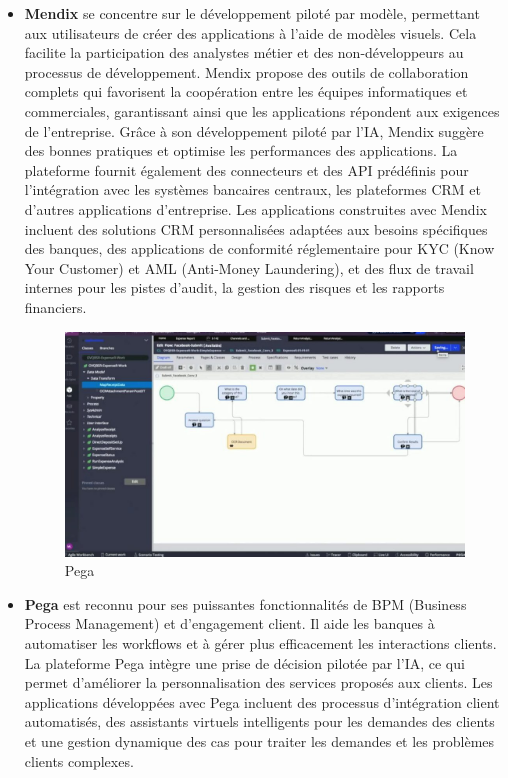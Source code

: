 \begin{itemize}
\item \textbf{Mendix} se concentre sur le développement piloté par modèle, permettant aux utilisateurs de créer des applications à l'aide de modèles visuels. Cela facilite la participation des analystes métier et des non-développeurs au processus de développement. Mendix propose des outils de collaboration complets qui favorisent la coopération entre les équipes informatiques et commerciales, garantissant ainsi que les applications répondent aux exigences de l'entreprise. Grâce à son développement piloté par l'IA, Mendix suggère des bonnes pratiques et optimise les performances des applications. La plateforme fournit également des connecteurs et des API prédéfinis pour l'intégration avec les systèmes bancaires centraux, les plateformes CRM et d'autres applications d'entreprise. Les applications construites avec Mendix incluent des solutions CRM personnalisées adaptées aux besoins spécifiques des banques, des applications de conformité réglementaire pour KYC (Know Your Customer) et AML (Anti-Money Laundering), et des flux de travail internes pour les pistes d'audit, la gestion des risques et les rapports financiers.



\begin{figure}[H] 
    \centering
    \includegraphics[width=15cm]{Figures/pega.jpg}
    \caption{Pega}
    \label{fig:my_label} %
\end{figure}

\item \textbf{Pega} est reconnu pour ses puissantes fonctionnalités de BPM (Business Process Management) et d'engagement client. Il aide les banques à automatiser les workflows et à gérer plus efficacement les interactions clients. La plateforme Pega intègre une prise de décision pilotée par l'IA, ce qui permet d'améliorer la personnalisation des services proposés aux clients. Les applications développées avec Pega incluent des processus d'intégration client automatisés, des assistants virtuels intelligents pour les demandes des clients et une gestion dynamique des cas pour traiter les demandes et les problèmes clients complexes.



\end{itemize}
